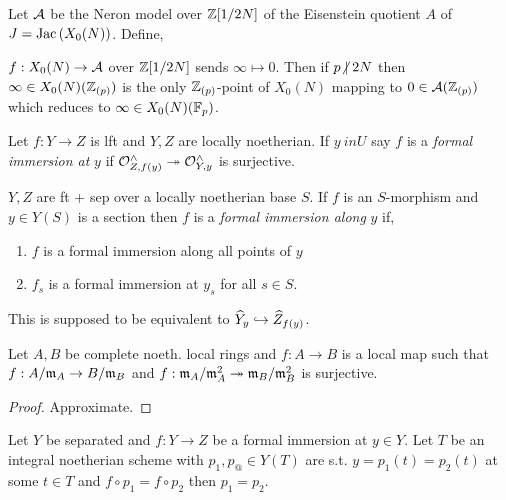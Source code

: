 \documentclass[12pt]{article}
\begin{document}
\begin{prop}
Let $\mathcal{A}$ be the Neron model over $\mathbb{Z}[1/2N]$ of the Eisenstein quotient $A$ of $J = \mathrm{Jac}\left( X_0(N) \right)$. Define,
\begin{center}
\end{center}
$f : X_0(N) \to \mathcal{A}$ over $\mathbb{Z}[1/2N]$ sends $\infty \mapsto 0$.
Then if $p \ndivides 2 N$ then $\infty \in X_0(N)(\mathbb{Z}_{(p)})$ is the only $\mathbb{Z}_{(p)}$-point of $X_0(N)$ mapping to $0 \in \mathcal{A}(\mathbb{Z}_{(p)})$ which reduces to $\infty \in X_0(N)(\mathbb{F}_p)$. 
\end{prop}

\begin{defn}
Let $f : Y \to Z$ is lft and $Y,Z$ are locally noetherian. If $y\ in U$ say $f$ is a \textit{formal immersion at} $y$ if $\mathcal{O}_{Z, f(y)}^\wedge \twoheadrightarrow \mathcal{O}_{Y, y}^\wedge$ is surjective.
\end{defn}

\begin{defn}
$Y, Z$ are ft + sep over a locally noetherian base $S$. If $f$ is an $S$-morphism and $y \in Y(S)$ is a section then $f$ is a \textit{formal immersion along} $y$ if,
\begin{enumerate}
\item $f$ is a formal immersion along all points of $y$
\item $f_s$ is a formal immersion at $y_s$ for all $s \in S$.  
\end{enumerate}
\end{defn}

\begin{rmk}
This is supposed to be equivalent to $\widehat{Y}_y \hookrightarrow \widehat{Z}_{f(y)}$. 
\end{rmk}

\begin{lemma}
Let $A, B$ be complete noeth. local rings and $f : A \to B$ is a local map such that $f : A / \mathfrak{m}_A \to B / \mathfrak{m}_B$ and $f : \mathfrak{m}_A / \mathfrak{m}_A^2 \twoheadrightarrow \mathfrak{m}_B / \mathfrak{m}_B^2$ is surjective. 
\end{lemma}

\begin{proof}
Approximate. 
\end{proof}

\begin{prop}
Let $Y$ be separated and $f : Y \to Z$ be a formal immersion at $y \in Y$. Let $T$ be an integral noetherian scheme with $p_1, p_@ \in Y(T)$ are s.t. $y = p_1(t) = p_2(t)$ at some $t \in T$ and $f \circ p_1 = f \circ p_2$ then $p_1 = p_2$. 
\end{prop}
\end{document}
